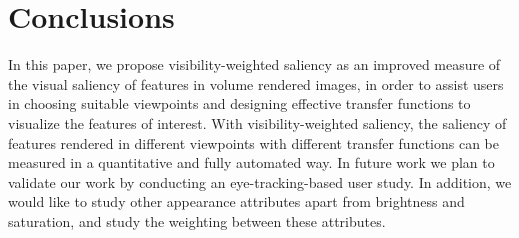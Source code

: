 \section{Conclusions}
In this paper, we propose visibility-weighted saliency as an improved measure of the visual saliency of features in volume rendered images, in order to assist users in choosing suitable viewpoints and designing effective transfer functions to visualize the features of interest.
With visibility-weighted saliency, the saliency of features rendered in different viewpoints with different transfer functions can be measured in a quantitative and fully automated way.
In future work we plan to validate our work by conducting an eye-tracking-based user study. In addition, we would like to study other appearance attributes apart from brightness and saturation, and study the weighting between these attributes.
